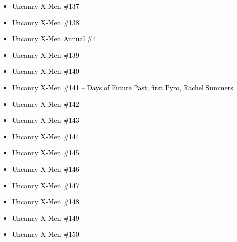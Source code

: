 \documentclass[12pt]{article}
\newcommand{\checkbox}{\raisebox{0.0ex}{\fbox{\rule{0ex}{1.5ex} \rule{1.5ex}{0ex}}}}
\begin{document}
\vspace{0.3cm}
\noindent
\begin{tcolorbox}[
  colback=white!95!gray,
  colframe=black,
  width=\textwidth,
  arc=4mm,
  auto outer arc,
  boxrule=0.8pt,
  left=8pt,right=8pt,top=8pt,bottom=8pt
]
\begin{itemize}[left=0pt,label={\checkbox}]
  \item \textcolor{black}{Uncanny X-Men \#137}
  \item \textcolor{black}{Uncanny X-Men \#138}
  \item \textcolor{black}{Uncanny X-Men Annual \#4}
  \item \textcolor{black}{Uncanny X-Men \#139}
  \item \textcolor{black}{Uncanny X-Men \#140}
  \item \textcolor{black}{Uncanny X-Men \#141 – Days of Future Past; first Pyro, Rachel Summers}
  \item \textcolor{black}{Uncanny X-Men \#142}
  \item \textcolor{black}{Uncanny X-Men \#143}
  \item \textcolor{black}{Uncanny X-Men \#144}
  \item \textcolor{black}{Uncanny X-Men \#145}
  \item \textcolor{black}{Uncanny X-Men \#146}
  \item \textcolor{black}{Uncanny X-Men \#147}
  \item \textcolor{black}{Uncanny X-Men \#148}
  \item \textcolor{black}{Uncanny X-Men \#149}
  \item \textcolor{black}{Uncanny X-Men \#150}
\end{itemize}
\end{tcolorbox}

\newpage
{}
\end{document}
